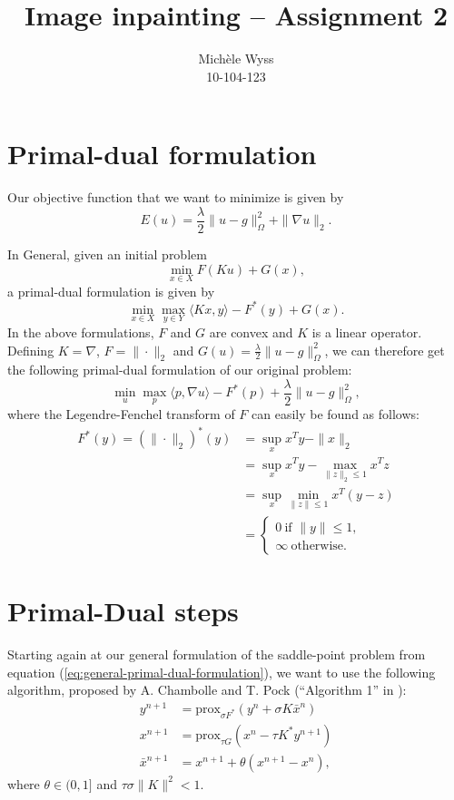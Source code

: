 \documentclass{paper}
\title{Image inpainting -- Assignment 2}
\author{Mich\`ele Wyss \\10-104-123}
\newcommand{\prox}{\text{prox}}
\begin{document}
\maketitle


%

\section{Primal-dual formulation}
\label{sec:primal-dual-formulation}
Our objective function that we want to minimize is given by 
$$E(u) = \frac{\lambda}{2} \|u-g\|_\Omega^2 + \|\nabla u\|_2.$$

In General, given an initial problem
$$\min_{x \in X}F(Ku) + G(x),$$
a primal-dual formulation is given by
\begin{equation}
\min_{x \in X} \max_{y \in Y} \langle Kx, y \rangle - F^*(y) + G(x). 
\label{eq:general-primal-dual-formulation}
\end{equation}
In the above formulations, $F$ and $G$ are convex and $K$ is a linear operator. Defining $K = \nabla$, $F = \|\cdot\|_2$ and $G(u) = \frac{\lambda}{2}\|u-g\|_\Omega^2$, we can therefore get the following primal-dual formulation of our original problem:
$$\min_u \max_p \langle p,\nabla u \rangle - F^*(p) + \frac{\lambda}{2} \|u-g\|_\Omega^2,$$
where the Legendre-Fenchel transform of $F$ can easily be found as follows:
\begin{align*}
 F^*(y) = (\|\cdot \|_2)^* (y) &= \sup_x x^Ty - \|x\|_2 \\
 &= \sup_x x^Ty - \max_{\|z\|_2 \leq 1} x^Tz \\
 &= \sup_x \min_{\|z\| \leq 1} x^T (y-z) \\
 &= \begin{cases} 0 ~ \text{if } \|y\| \leq 1, \\ \infty ~ \text{otherwise.} \end{cases}
\end{align*}

\section{Primal-Dual steps}
\label{sec:primal-dual-steps}
Starting again at our general formulation of the saddle-point problem from equation (\ref{eq:general-primal-dual-formulation}), we want to use the following algorithm, proposed by A. Chambolle and T. Pock  (``Algorithm 1'' in \cite{chambolle2011first}):
\begin{align*}
 y^{n+1} &= \prox_{\sigma F^*}(y^n + \sigma K \bar x^n) \\
 x^{n+1} &= \prox_{\tau G}(x^n - \tau K^* y^{n+1}) \\
 \bar x^{n+1} &= x^{n+1} + \theta(x^{n+1} - x^n),
\end{align*}
where $\theta \in (0,1]$ and $\tau \sigma \|K\|^2 < 1.$ 
\end{document}
